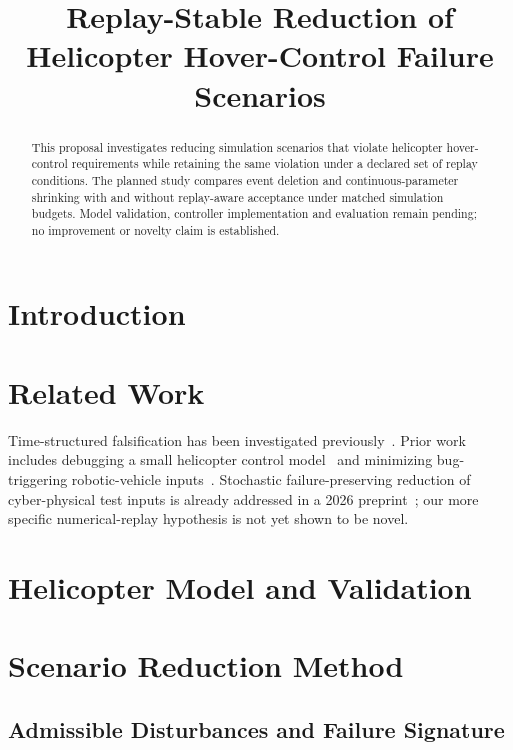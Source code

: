\documentclass[letterpaper,10pt,conference]{ieeeconf}
\title{\LARGE\bf Replay-Stable Reduction of Helicopter Hover-Control Failure Scenarios}
\begin{document}
\maketitle
\thispagestyle{empty}
\pagestyle{empty}
\begin{abstract}
This proposal investigates reducing simulation scenarios that violate helicopter hover-control requirements while retaining the same violation under a declared set of replay conditions. The planned study compares event deletion and continuous-parameter shrinking with and without replay-aware acceptance under matched simulation budgets. Model validation, controller implementation and evaluation remain pending; no improvement or novelty claim is established.
\end{abstract}

\section{Introduction}

\section{Related Work}
Time-structured falsification has been investigated previously~\cite{ernst2022}.
Prior work includes debugging a small helicopter control model~\cite{singh2020} and minimizing bug-triggering robotic-vehicle inputs~\cite{wang2026}.
Stochastic failure-preserving reduction of cyber-physical test inputs is already addressed in a 2026 preprint~\cite{valle2026}; our more specific numerical-replay hypothesis is not yet shown to be novel.

\section{Helicopter Model and Validation}

\section{Scenario Reduction Method}
\subsection{Admissible Disturbances and Failure Signature}
\end{document}
